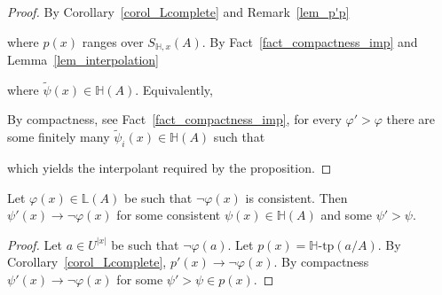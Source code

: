 \documentclass[11pt,oneside]{amsart}
\begin{document}
\begin{proof}
  By Corollary~\ref{corol_Lcomplete} and Remark~\ref{lem_p'p}


  where $p(x)$ ranges over $S_{\mathds{H},x}(A)$.
  By Fact~\ref{fact_compactness_imp} and Lemma~\ref{lem_interpolation}


  where $\tilde{\psi}(x)\in\mathds{H}(A)$.
  Equivalently,


  By compactness, see Fact~\ref{fact_compactness_imp}, for every $\varphi'>\varphi$ there are some finitely many $\tilde{\psi}_i(x)\in\mathds{H}(A)$ such that


  which yields the interpolant required by the proposition.
\end{proof}

\begin{proposition}\label{prop_LHapprox2}
  Let $\varphi(x)\in\mathds{L}(A)$ be such that $\neg\varphi(x)$ is consistent.
  Then  $\psi'(x)\rightarrow\neg\varphi(x)$ for some consistent $\psi(x)\in\mathds{H}(A)$ and some $\psi'>\psi$.
\end{proposition}



\begin{proof}
  Let $a\in U^{|x|}$ be such that $\neg\varphi(a)$.
  Let $p(x)=\mathds{H}\mbox{-tp}(a/A)$.
  By Corollary~\ref{corol_Lcomplete}, $p'(x)\rightarrow\neg\varphi(x)$. 
  By compactness  $\psi'(x)\rightarrow\neg\varphi(x)$ for some $\psi'>\psi\in p(x)$. 
\end{proof}
\end{document}

